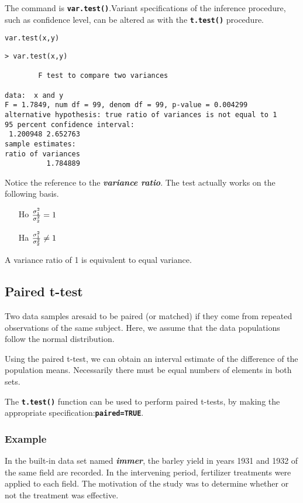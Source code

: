 The command is \textbf{\texttt{var.test()}}.Variant specifications of the inference procedure, such as confidence level, can be altered as with the \texttt{\textbf{t.test()}} procedure.
\begin{framed}
\begin{verbatim}
var.test(x,y)
\end{verbatim}
\end{framed}
\begin{verbatim}
> var.test(x,y)

        F test to compare two variances

data:  x and y
F = 1.7849, num df = 99, denom df = 99, p-value = 0.004299
alternative hypothesis: true ratio of variances is not equal to 1
95 percent confidence interval:
 1.200948 2.652763
sample estimates:
ratio of variances
          1.784889
\end{verbatim}


Notice the reference to the \emph{\textbf{variance ratio}}. The test actually works on the following basis.

\begin{itemize}
\item[Ho] ${ \sigma^2_1 \over \sigma^2_2} = 1$
\item[Ha] ${ \sigma^2_1 \over \sigma^2_2} \neq 1$
\end{itemize}
A variance ratio of 1 is equivalent to equal variance.
\subsection{Paired t-test}
Two data samples aresaid to be paired (or matched) if they come from repeated observations of the same subject. Here, we assume that the data populations follow the normal distribution.

Using the paired t-test, we can obtain an interval estimate of the difference of the population means. Necessarily there must be equal numbers of elements in both sets.

The \textbf{\texttt{t.test()}} function can be used to perform paired t-tests, by making the appropriate specification:\textbf{\texttt{paired=TRUE}}.


\subsubsection{Example}
In the built-in data set named \textbf{\emph{immer}}, the barley yield in years 1931 and 1932 of the same field are recorded. In the intervening period, fertilizer treatments were applied to each field. The motivation of the study was to determine whether or not the treatment was effective.

